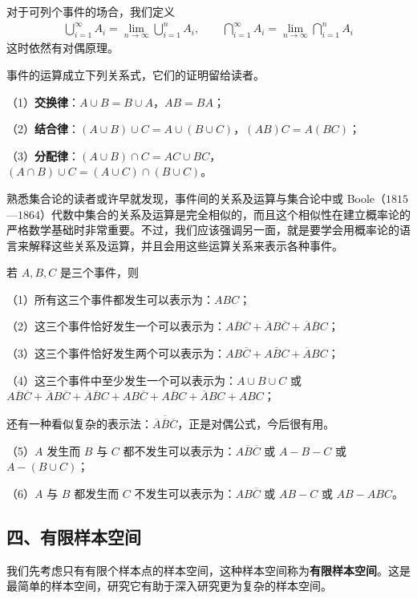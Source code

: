 \documentclass[../../main.tex]{subfiles}
\begin{document}
对于可列个事件的场合，我们定义
\begin{align*}
\bigcup_{i=1}^{\infty}A_i=\lim_{n\to\infty}\bigcup_{i=1}^{n}A_i,\qquad \bigcap_{i=1}^{\infty}A_i=\lim_{n\to\infty}\bigcap_{i=1}^{n}A_i
\end{align*}
这时依然有对偶原理。

事件的运算成立下列关系式，它们的证明留给读者。

（1）\textbf{交换律}：$A\cup B=B\cup A$，$AB=BA$；

（2）\textbf{结合律}：$(A\cup B)\cup C=A\cup(B\cup C)$，$(AB)C=A(BC)$；

（3）\textbf{分配律}：$(A\cup B)\cap C=AC\cup BC$，$(A\cap B)\cup C=(A\cup C)\cap(B\cup C)$。

熟悉集合论的读者或许早就发现，事件间的关系及运算与集合论中或 Boole（$1815$—$1864$）代数中集合的关系及运算是完全相似的，而且这个相似性在建立概率论的严格数学基础时非常重要。不过，我们应该强调另一面，就是要学会用概率论的语言来解释这些关系及运算，并且会用这些运算关系来表示各种事件。

\begin{example}[三事件关系]\label{example:ch01-三事件关系}
若 $A,B,C$ 是三个事件，则

（1）所有这三个事件都发生可以表示为：$ABC$；

（2）这三个事件恰好发生一个可以表示为：$A\overline{B}\overline{C}+\overline{A}B\overline{C}+\overline{A}\overline{B}C$；

（3）这三个事件恰好发生两个可以表示为：$AB\overline{C}+A\overline{B}C+\overline{A}BC$；

（4）这三个事件中至少发生一个可以表示为：$A\cup B\cup C$ 或 $A\overline{B}\overline{C}+\overline{A}B\overline{C}+\overline{A}\overline{B}C+AB\overline{C}+A\overline{B}C+\overline{A}BC+ABC$；

还有一种看似复杂的表示法：$\overline{\overline{A}\overline{B}\overline{C}}$，正是对偶公式，今后很有用。

（5）$A$ 发生而 $B$ 与 $C$ 都不发生可以表示为：$A\overline{B}\overline{C}$ 或 $A-B-C$ 或 $A-(B\cup C)$；

（6）$A$ 与 $B$ 都发生而 $C$ 不发生可以表示为：$AB\overline{C}$ 或 $AB-C$ 或 $AB-ABC$。
\end{example}

\subsection*{四、有限样本空间}

我们先考虑只有有限个样本点的样本空间，这种样本空间称为\textbf{有限样本空间}。这是最简单的样本空间，研究它有助于深入研究更为复杂的样本空间。
\end{document}
